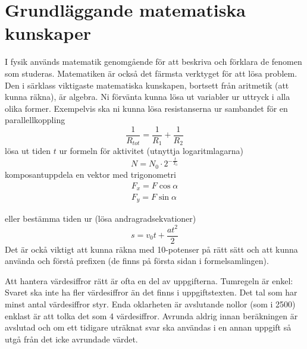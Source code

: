 \documentclass[10pt, titlepage, oneside, a4paper]{article}
\newcommand{\Section}[1]{\section{#1}\vspace{-8pt}}
\begin{document}

    \setlength{\parindent}{0pt}
    \setlength{\parskip}{10pt}


    \Section{Grundläggande matematiska kunskaper}
    I fysik används matematik genomgående för att beskriva och förklara de fenomen som studeras. Matematiken är också det
    färmsta verktyget för att lösa problem. Den i särklass viktigaste matematiska kunskapen, bortsett från aritmetik
    (att kunna räkna), är algebra. Ni förvänta kunna lösa ut variabler ur uttryck i alla olika former. Exempelvis ska ni
    kunna lösa resistanserna ur sambandet för en parallellkoppling
    \begin{equation}
        \frac{1}{R_{tot}} = \frac{1}{R_{1}}+\frac{1}{R_{2}}
    \end{equation}
    lösa ut tiden $t$ ur formeln för aktivitet (utnyttja logaritmlagarna)
    \begin{equation}
        N = N_0 \cdot 2^{-\frac{t}{T_{0}}}
    \end{equation}
    komposantuppdela en vektor med trigonometri
    \begin{eqnarray}
        F_x = F \cos{\alpha} \\
        F_y = F \sin{\alpha}
    \end{eqnarray}

    eller bestämma tiden ur (lösa andragradsekvationer)
    \begin{equation}
        s = v_0 t + \frac{a t^2}{2}
    \end{equation}
    Det är ockå viktigt att kunna räkna med 10-potenser på rätt sätt och att kunna använda och förstå prefixen (de finns på
    första sidan i formelsamlingen).

    Att hantera värdesiffror rätt är ofta en del av uppgifterna. Tumregeln är enkel: Svaret ska inte ha fler värdesiffror
    än det finns i uppgiftstexten. Det tal som har minst antal värdesiffror styr. Enda oklarheten är avslutande nollor
    (som i 2500) enklast är att tolka det som 4 värdesiffror. Avrunda aldrig innan beräkningen är avslutad och om ett
    tidigare uträknat svar ska användas i en annan uppgift så utgå från det icke avrundade värdet.
\end{document}
